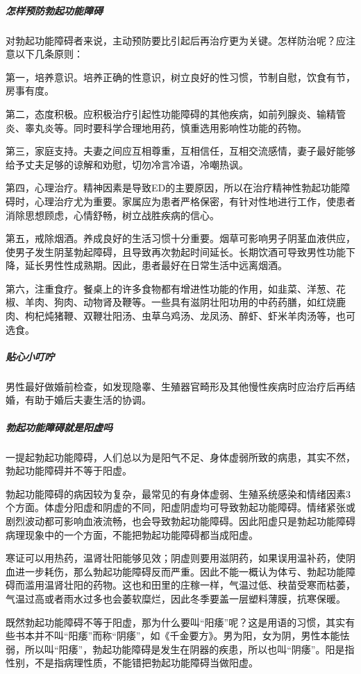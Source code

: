 \subparagraph{怎样预防勃起功能障碍}

对勃起功能障碍者来说，主动预防要比引起后再治疗更为关键。怎样防治呢？应注意以下几条原则：

第一，培养意识。培养正确的性意识，树立良好的性习惯，节制自慰，饮食有节，房事有度。

第二，态度积极。应积极治疗引起性功能障碍的其他疾病，如前列腺炎、输精管炎、睾丸炎等。同时要科学合理地用药，慎重选用影响性功能的药物。

第三，家庭支持。夫妻之间应互相尊重，互相信任，互相交流感情，妻子最好能够给予丈夫足够的谅解和劝慰，切勿冷言冷语，冷嘲热讽。

第四，心理治疗。精神因素是导致ED的主要原因，所以在治疗精神性勃起功能障碍时，心理治疗尤为重要。家属应为患者严格保密，有针对性地进行工作，使患者消除思想顾虑，心情舒畅，树立战胜疾病的信心。

第五，戒除烟酒。养成良好的生活习惯十分重要。烟草可影响男子阴茎血液供应，使男子发生阴茎勃起障碍，且导致再次勃起时间延长。长期饮酒可导致男性功能下降，延长男性性成熟期。因此，患者最好在日常生活中远离烟酒。

第六，注重食疗。餐桌上的许多食物都有增进性功能的作用，如韭菜、洋葱、花椒、羊肉、狗肉、动物肾及鞭等。一些具有滋阴壮阳功用的中药药膳，如红烧鹿肉、枸杞炖猪鞭、双鞭壮阳汤、虫草乌鸡汤、龙凤汤、醉虾、虾米羊肉汤等，也可选食。

\subparagraph{贴心小叮咛}

男性最好做婚前检查，如发现隐睾、生殖器官畸形及其他慢性疾病时应治疗后再结婚，有助于婚后夫妻生活的协调。

\subparagraph{勃起功能障碍就是阳虚吗}

一提起勃起功能障碍，人们总以为是阳气不足、身体虚弱所致的病患，其实不然，勃起功能障碍并不等于阳虚。

勃起功能障碍的病因较为复杂，最常见的有身体虚弱、生殖系统感染和情绪因素3个方面。体虚分阳虚和阴虚的不同，阳虚阴虚均可导致勃起功能障碍。情绪紧张或剧烈波动都可影响血液流畅，也会导致勃起功能障碍。因此阳虚只是勃起功能障碍病理现象中的一个方面，不能把勃起功能障碍都当成阳虚。

寒证可以用热药，温肾壮阳能够见效；阴虚则要用滋阴药，如果误用温补药，使阴血进一步耗伤，那么勃起功能障碍反而严重。因此不能一概认为体亏、勃起功能障碍而滥用温肾壮阳的药物。这也和田里的庄稼一样，气温过低、秧苗受寒而枯萎，气温过高或者雨水过多也会萎软糜烂，因此冬季要盖一层塑料薄膜，抗寒保暖。

既然勃起功能障碍不等于阳虚，那为什么要叫“阳痿”呢？这是用语的习惯，其实有些书本并不叫“阳痿”而称“阴痿”，如《千金要方》。男为阳，女为阴，男性本能怯弱，所以叫“阳痿”，勃起功能障碍是发生在阴器的疾患，所以也叫“阴痿”。阳是指性别，不是指病理性质，不能错把勃起功能障碍当做阳虚。

